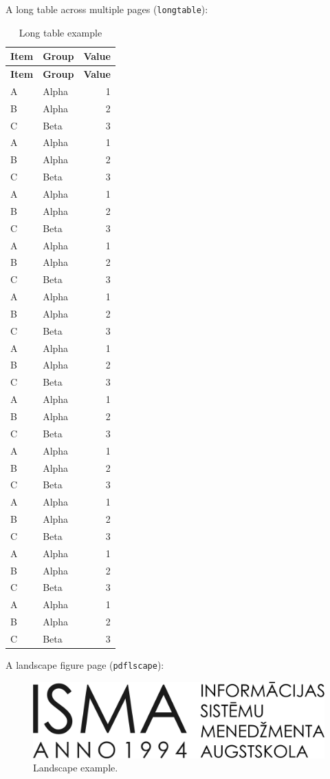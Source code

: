 A long table across multiple pages (\texttt{longtable}):
\begin{longtable}{llr}
\caption{Long table example}\label{tab:long}\\
\toprule
\textbf{Item} & \textbf{Group} & \textbf{Value}\\
\midrule
\endfirsthead
\toprule
\textbf{Item} & \textbf{Group} & \textbf{Value}\\
\midrule
\endhead
\bottomrule
\endfoot
A & Alpha & 1\\
B & Alpha & 2\\
C & Beta  & 3\\
A & Alpha & 1\\
B & Alpha & 2\\
C & Beta  & 3\\
A & Alpha & 1\\
B & Alpha & 2\\
C & Beta  & 3\\
A & Alpha & 1\\
B & Alpha & 2\\
C & Beta  & 3\\
A & Alpha & 1\\
B & Alpha & 2\\
C & Beta  & 3\\
A & Alpha & 1\\
B & Alpha & 2\\
C & Beta  & 3\\
A & Alpha & 1\\
B & Alpha & 2\\
C & Beta  & 3\\
A & Alpha & 1\\
B & Alpha & 2\\
C & Beta  & 3\\
A & Alpha & 1\\
B & Alpha & 2\\
C & Beta  & 3\\
A & Alpha & 1\\
B & Alpha & 2\\
C & Beta  & 3\\
A & Alpha & 1\\
B & Alpha & 2\\
C & Beta  & 3\\
\end{longtable}

A landscape figure page (\texttt{pdflscape}):
\begin{landscape}
\begin{figure}[h]
  \centering
  \includegraphics[width=.9\linewidth]{b_chapters/chapter1/assets/isma_logo.png}
  \caption{Landscape example.}
\end{figure}
\end{landscape}

